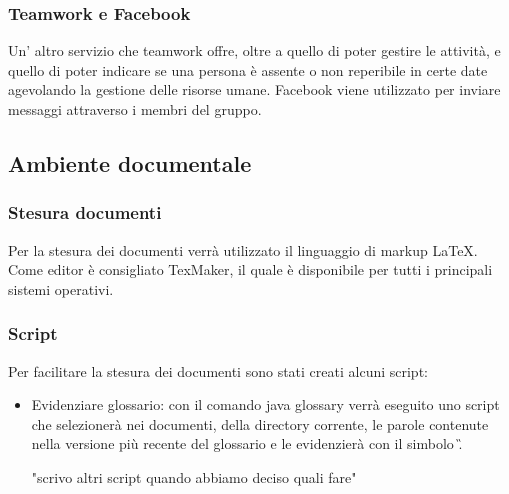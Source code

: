 \subsubsection{Teamwork e Facebook}

Un' altro servizio che teamwork offre, oltre a quello di poter gestire le attività, e quello di poter indicare se una persona è assente o non reperibile in certe date agevolando la gestione delle risorse umane.
Facebook viene utilizzato per inviare messaggi attraverso i membri del gruppo.

\subsection{Ambiente documentale}

\subsubsection{Stesura documenti}

Per la stesura dei documenti verrà utilizzato il linguaggio di markup \LaTeX.
Come editor è consigliato TexMaker, il quale è disponibile per tutti i principali sistemi operativi.

\subsubsection{Script}

Per facilitare la stesura dei documenti sono stati creati alcuni script:

\begin{itemize}
	\item Evidenziare glossario: con il comando java glossary verrà eseguito uno script che selezionerà nei documenti, della directory corrente, le parole contenute nella versione più recente del glossario e le evidenzierà con il simbolo \G.
	
	"scrivo altri script quando abbiamo deciso quali fare"

\end{itemize}

